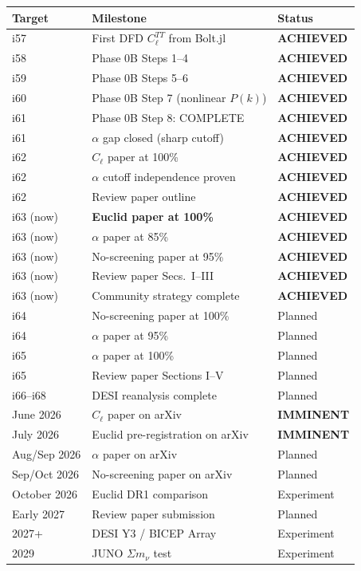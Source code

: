 \documentclass[11pt,a4paper]{article}
\begin{document}
\begin{center}
\begin{longtable}{lll}
\toprule
\textbf{Target} & \textbf{Milestone} & \textbf{Status} \\
\midrule
i57 & First DFD $C_\ell^{TT}$ from Bolt.jl & \textbf{ACHIEVED} \\
i58 & Phase 0B Steps 1--4 & \textbf{ACHIEVED} \\
i59 & Phase 0B Steps 5--6 & \textbf{ACHIEVED} \\
i60 & Phase 0B Step 7 (nonlinear $P(k)$) & \textbf{ACHIEVED} \\
i61 & Phase 0B Step 8: COMPLETE & \textbf{ACHIEVED} \\
i61 & $\alpha$ gap closed (sharp cutoff) & \textbf{ACHIEVED} \\
i62 & $C_\ell$ paper at 100\% & \textbf{ACHIEVED} \\
i62 & $\alpha$ cutoff independence proven & \textbf{ACHIEVED} \\
i62 & Review paper outline & \textbf{ACHIEVED} \\
i63 (now) & \textbf{Euclid paper at 100\%} & \textbf{ACHIEVED} \\
i63 (now) & $\alpha$ paper at 85\% & \textbf{ACHIEVED} \\
i63 (now) & No-screening paper at 95\% & \textbf{ACHIEVED} \\
i63 (now) & Review paper Secs.\ I--III & \textbf{ACHIEVED} \\
i63 (now) & Community strategy complete & \textbf{ACHIEVED} \\
\midrule
i64 & No-screening paper at 100\% & Planned \\
i64 & $\alpha$ paper at 95\% & Planned \\
i65 & $\alpha$ paper at 100\% & Planned \\
i65 & Review paper Sections I--V & Planned \\
i66--i68 & DESI reanalysis complete & Planned \\
\midrule
June 2026 & $C_\ell$ paper on arXiv & \textbf{IMMINENT} \\
July 2026 & Euclid pre-registration on arXiv & \textbf{IMMINENT} \\
Aug/Sep 2026 & $\alpha$ paper on arXiv & Planned \\
Sep/Oct 2026 & No-screening paper on arXiv & Planned \\
October 2026 & Euclid DR1 comparison & Experiment \\
Early 2027 & Review paper submission & Planned \\
2027+ & DESI Y3 / BICEP Array & Experiment \\
2029 & JUNO $\Sigma m_\nu$ test & Experiment \\
\bottomrule
\end{longtable}
\end{center}
\end{document}
